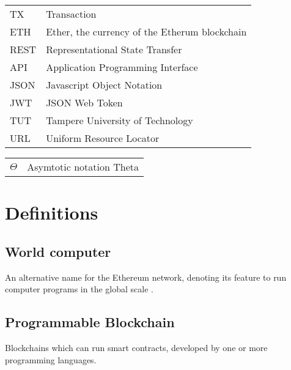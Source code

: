 \documentclass[twoside,numperchapter]{tutthesis} %
\begin{document}

\begin{tabular}[h]{@{} p{} p{} @{}}
TX & Transaction \\
ETH & Ether, the currency of the Etherum blockchain \\
REST & Representational State Transfer \\ 
API & Application Programming Interface \\
JSON & Javascript Object Notation \\
JWT & JSON Web Token \\
TUT & Tampere University of Technology \\
URL & Uniform Resource Locator 
\end{tabular}

\begin{tabular}[h]{@{} p{} p{} @{}}
$\Theta$ & Asymtotic notation Theta \\
\end{tabular}

\chapter*{Definitions}

\section*{World computer}

An alternative name for the Ethereum network, denoting its feature to run computer programs in the global scale \citep{EthereumWorldComputer}.

\section*{Programmable Blockchain}

Blockchains which can run smart contracts, developed by one or more programming languages.










\end{document}
